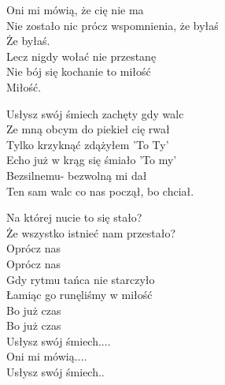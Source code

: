 \begin{text}
    Oni mi mówią, że cię nie ma\\
    Nie zostało nic prócz wspomnienia, że byłaś\\
    Że byłaś.\\
    Lecz nigdy wołać nie przestanę\\
    Nie bój się kochanie to miłość\\
    Miłość.

    Usłysz swój śmiech zachęty gdy walc\\
    Ze mną obcym do piekieł cię rwał\\
    Tylko krzyknąć zdążyłem 'To Ty'\\
    Echo już w krąg się śmiało 'To my'\\
    Bezsilnemu- bezwolną mi dał\\
    Ten sam walc co nas począł, bo chciał.

    Na której nucie to się stało?\\
    Że wszystko istnieć nam przestało?\\
    Oprócz nas\\
    Oprócz nas\\
    Gdy rytmu tańca nie starczyło\\
    Łamiąc go runęliśmy w miłość\\
    Bo już czas\\
    Bo już czas\\

    Usłysz swój śmiech....\\
    Oni mi mówią....\\
    Usłysz swój śmiech..
\end{text}
\begin{chord}

\end{chord}